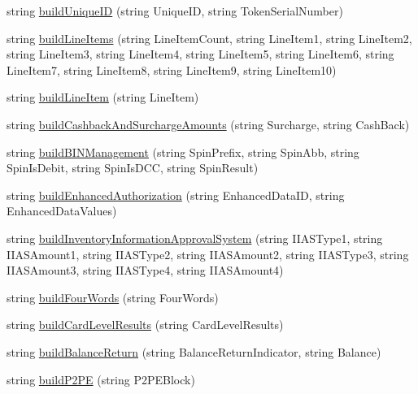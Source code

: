 \begin{DoxyCompactItemize}
\item 
string \mbox{\hyperlink{class_form_sim_1_1_t_c_p_handler_ac8e49c8548bb66c3239b6f711afa3337}{build\+Unique\+ID}} (string Unique\+ID, string Token\+Serial\+Number)
\item 
string \mbox{\hyperlink{class_form_sim_1_1_t_c_p_handler_a05479dfb88131d0e857a6b882c60d21b}{build\+Line\+Items}} (string Line\+Item\+Count, string Line\+Item1, string Line\+Item2, string Line\+Item3, string Line\+Item4, string Line\+Item5, string Line\+Item6, string Line\+Item7, string Line\+Item8, string Line\+Item9, string Line\+Item10)
\item 
string \mbox{\hyperlink{class_form_sim_1_1_t_c_p_handler_ab3c968e347431409241d17aeebd02658}{build\+Line\+Item}} (string Line\+Item)
\item 
string \mbox{\hyperlink{class_form_sim_1_1_t_c_p_handler_a825fa707805dec081a03e08ff34deaef}{build\+Cashback\+And\+Surcharge\+Amounts}} (string Surcharge, string Cash\+Back)
\item 
string \mbox{\hyperlink{class_form_sim_1_1_t_c_p_handler_a74f16929ee87f2adcd72cb83041cb1c8}{build\+B\+I\+N\+Management}} (string Spin\+Prefix, string Spin\+Abb, string Spin\+Is\+Debit, string Spin\+Is\+D\+CC, string Spin\+Result)
\item 
string \mbox{\hyperlink{class_form_sim_1_1_t_c_p_handler_a378279fe5affb6172f80bed27f88d135}{build\+Enhanced\+Authorization}} (string Enhanced\+Data\+ID, string Enhanced\+Data\+Values)
\item 
string \mbox{\hyperlink{class_form_sim_1_1_t_c_p_handler_abdb585c67d61a7496cff8bb6d6375557}{build\+Inventory\+Information\+Approval\+System}} (string I\+I\+A\+S\+Type1, string I\+I\+A\+S\+Amount1, string I\+I\+A\+S\+Type2, string I\+I\+A\+S\+Amount2, string I\+I\+A\+S\+Type3, string I\+I\+A\+S\+Amount3, string I\+I\+A\+S\+Type4, string I\+I\+A\+S\+Amount4)
\item 
string \mbox{\hyperlink{class_form_sim_1_1_t_c_p_handler_a7d6134b876c094553e3b9cd4788711ee}{build\+Four\+Words}} (string Four\+Words)
\item 
string \mbox{\hyperlink{class_form_sim_1_1_t_c_p_handler_a059fa8efc59b79fcc0431b98692ef340}{build\+Card\+Level\+Results}} (string Card\+Level\+Results)
\item 
string \mbox{\hyperlink{class_form_sim_1_1_t_c_p_handler_a3400d87919fc5a21ecf0c824b5a638ce}{build\+Balance\+Return}} (string Balance\+Return\+Indicator, string Balance)
\item 
string \mbox{\hyperlink{class_form_sim_1_1_t_c_p_handler_ac81cff19c7ebc749ac9aca531b23791c}{build\+P2\+PE}} (string P2\+P\+E\+Block)

\end{DoxyCompactItemize}
